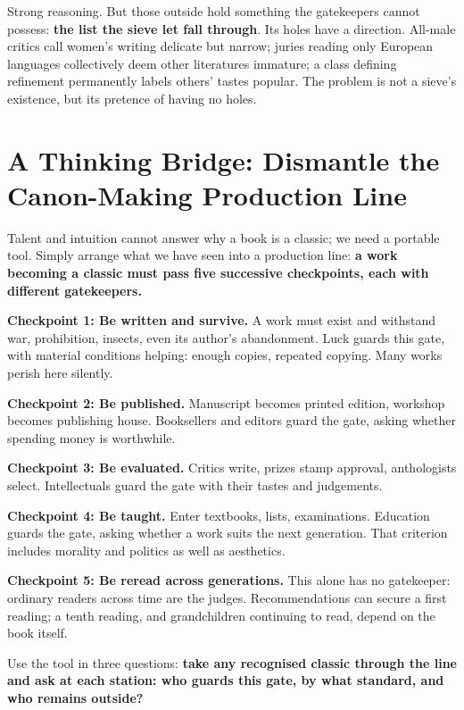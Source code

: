 Strong reasoning. But those outside hold something the gatekeepers cannot possess: \textbf{the list the sieve let fall through}. Its holes have a direction. All-male critics call women's writing delicate but narrow; juries reading only European languages collectively deem other literatures immature; a class defining refinement permanently labels others' tastes popular. The problem is not a sieve's existence, but its pretence of having no holes.

\section[Thinking Bridge: The Canon-Making Line]{A Thinking Bridge: Dismantle the Canon-Making Production Line}
Talent and intuition cannot answer why a book is a classic; we need a portable tool. Simply arrange what we have seen into a production line: \textbf{a work becoming a classic must pass five successive checkpoints, each with different gatekeepers.}

\textbf{Checkpoint 1: Be written and survive.} A work must exist and withstand war, prohibition, insects, even its author's abandonment. Luck guards this gate, with material conditions helping: enough copies, repeated copying. Many works perish here silently.

\textbf{Checkpoint 2: Be published.} Manuscript becomes printed edition, workshop becomes publishing house. Booksellers and editors guard the gate, asking whether spending money is worthwhile.

\textbf{Checkpoint 3: Be evaluated.} Critics write, prizes stamp approval, anthologists select. Intellectuals guard the gate with their tastes and judgements.

\textbf{Checkpoint 4: Be taught.} Enter textbooks, lists, examinations. Education guards the gate, asking whether a work suits the next generation. That criterion includes morality and politics as well as aesthetics.

\textbf{Checkpoint 5: Be reread across generations.} This alone has no gatekeeper: ordinary readers across time are the judges. Recommendations can secure a first reading; a tenth reading, and grandchildren continuing to read, depend on the book itself.

Use the tool in three questions: \textbf{take any recognised classic through the line and ask at each station: who guards this gate, by what standard, and who remains outside?}


